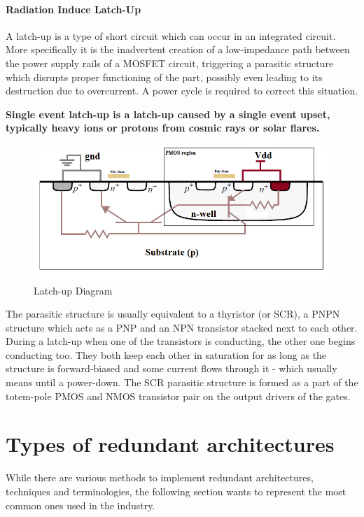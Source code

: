 \documentclass[./dissertation.tex]{subfiles}
\begin{document}
\paragraph{Radiation Induce Latch-Up}

A latch-up is a type of short circuit which can occur in an integrated circuit. More specifically it is the inadvertent creation of a low-impedance path between the power supply rails of a MOSFET circuit, triggering a parasitic structure which disrupts proper functioning of the part, possibly even leading to its destruction due to overcurrent. A power cycle is required to correct this situation.

\textbf{Single event latch-up is a latch-up caused by a single event upset, typically heavy ions or protons from cosmic rays or solar flares.}
\begin{figure}[h!]
\centering
  \includegraphics[scale = 0.50]{Latchup.png}
  \caption{Latch-up Diagram}
  \label{fig:coldred}
\end{figure}
The parasitic structure is usually equivalent to a thyristor (or SCR), a PNPN structure which acts as a PNP and an NPN transistor stacked next to each other. During a latch-up when one of the transistors is conducting, the other one begins conducting too. They both keep each other in saturation for as long as the structure is forward-biased and some current flows through it - which usually means until a power-down. The SCR parasitic structure is formed as a part of the totem-pole PMOS and NMOS transistor pair on the output drivers of the gates. 


\section{Types of redundant architectures}
While there are various methods to implement redundant architectures, techniques and terminologies, the following section wants to represent the most common ones used in the industry.
\end{document}
